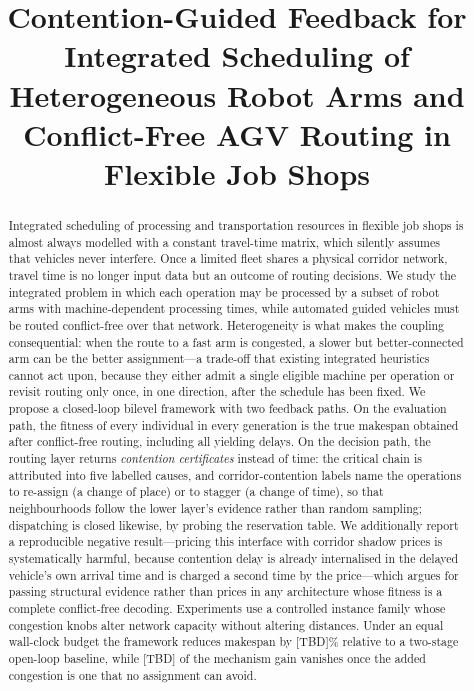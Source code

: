 \documentclass[manuscript,screen,review]{acmart}
\begin{document}
\title{Contention-Guided Feedback for Integrated Scheduling of Heterogeneous Robot Arms and Conflict-Free AGV Routing in Flexible Job Shops}


\begin{abstract}
Integrated scheduling of processing and transportation resources in flexible job
shops is almost always modelled with a constant travel-time matrix, which
silently assumes that vehicles never interfere. Once a limited fleet shares a
physical corridor network, travel time is no longer input data but an outcome of
routing decisions. We study the integrated problem in which each operation may be
processed by a subset of robot arms with machine-dependent processing times,
while automated guided vehicles must be routed conflict-free over that network.
Heterogeneity is what makes the coupling consequential: when the route to a fast
arm is congested, a slower but better-connected arm can be the better
assignment---a trade-off that existing integrated heuristics cannot act upon,
because they either admit a single eligible machine per operation or revisit
routing only once, in one direction, after the schedule has been fixed. We propose a closed-loop bilevel framework with two
feedback paths. On the evaluation path, the fitness of every individual in every
generation is the true makespan obtained after conflict-free routing, including
all yielding delays. On the decision path, the routing layer returns
\emph{contention certificates} instead of time: the critical chain is attributed
into five labelled causes, and corridor-contention labels name the operations to
re-assign (a change of place) or to stagger (a change of time), so that
neighbourhoods follow the lower layer's evidence rather than random sampling;
dispatching is closed likewise, by probing the reservation table. We additionally
report a reproducible negative result---pricing this interface with corridor
shadow prices is systematically harmful, because contention delay is already
internalised in the delayed vehicle's own arrival time and is charged a second
time by the price---which argues for passing structural evidence rather than
prices in any architecture whose fitness is a complete conflict-free decoding.
Experiments use a controlled instance family whose congestion knobs alter network
capacity without altering distances. Under an equal wall-clock budget the
framework reduces makespan by [TBD]\% relative to a two-stage open-loop baseline,
while [TBD] of the mechanism gain vanishes once the added congestion is one that
no assignment can avoid.
\end{abstract}
\end{document}
